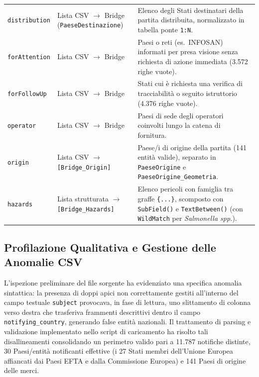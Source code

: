 \begin{table}[H]
\begin{tabularx}{\textwidth}{@{}>{\raggedright\arraybackslash}p{2.9cm}>{\raggedright\arraybackslash}p{2.8cm}>{\raggedright\arraybackslash}X@{}}
\texttt{distribution} & Lista CSV $\to$ Bridge (\texttt{PaeseDestinazione}) & Elenco degli Stati destinatari della partita distribuita, normalizzato in tabella ponte \texttt{1:N}. \\
\texttt{forAttention} & Lista CSV $\to$ Bridge & Paesi o reti (es.\ INFOSAN) informati per presa visione senza richiesta di azione immediata (3.572 righe vuote). \\
\texttt{forFollowUp} & Lista CSV $\to$ Bridge & Stati cui è richiesta una verifica di tracciabilità o seguito istruttorio (4.376 righe vuote). \\
\texttt{operator} & Lista CSV $\to$ Bridge & Paesi di sede degli operatori coinvolti lungo la catena di fornitura. \\
\texttt{origin} & Lista CSV $\to$ \texttt{[Bridge\_Origin]} & Paese/i di origine della partita (141 entità valide), separato in \texttt{PaeseOrigine} e \texttt{PaeseOrigine\_Geometria}. \\
\texttt{hazards} & Lista strutturata $\to$ \texttt{[Bridge\_Hazards]} & Elenco pericoli con famiglia tra graffe \texttt{\{...\}}, scomposto con \texttt{SubField()} e \texttt{TextBetween()} (con \texttt{WildMatch} per \textit{Salmonella spp.}). \\
\bottomrule
\end{tabularx}
\end{table}

\subsection{Profilazione Qualitativa e Gestione delle Anomalie CSV}
L'ispezione preliminare del file sorgente ha evidenziato una specifica anomalia sintattica: la presenza di doppi apici non correttamente gestiti all'interno del campo testuale \texttt{subject} provocava, in fase di lettura, uno slittamento di colonna verso destra che trasferiva frammenti descrittivi dentro il campo \texttt{notifying\_country}, generando false entità nazionali. Il trattamento di parsing e validazione implementato nello script di caricamento ha risolto tali disallineamenti consolidando un perimetro valido pari a 11.787 notifiche distinte, 30 Paesi/entità notificanti effettive (i 27 Stati membri dell'Unione Europea affiancati dai Paesi EFTA e dalla Commissione Europea) e 141 Paesi di origine delle merci.

